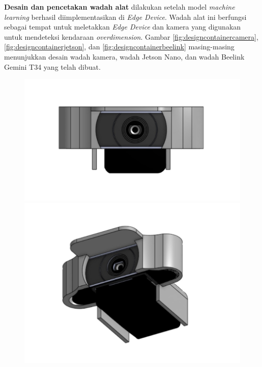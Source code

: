 \textbf{Desain dan pencetakan wadah alat} dilakukan setelah model \emph{machine learning} berhasil diimplementasikan di \emph{Edge Device}. Wadah alat ini berfungsi sebagai tempat untuk meletakkan \emph{Edge Device} dan kamera yang digunakan untuk mendeteksi kendaraan \emph{overdimension}. Gambar \ref{fig:designcontainercamera}, \ref{fig:designcontainerjetson}, dan \ref{fig:designcontainerbeelink} masing-masing menunjukkan desain wadah kamera, wadah Jetson Nano, dan wadah Beelink Gemini T34 yang telah dibuat.

\begin{figure}
  \centering

  \includegraphics[scale=0.16]{gambar/bab3-tampak-depan-case-camera.jpeg}
  \includegraphics[scale=0.16]{gambar/bab3-tampak-samping-case-camera.jpeg}

\end{figure}
